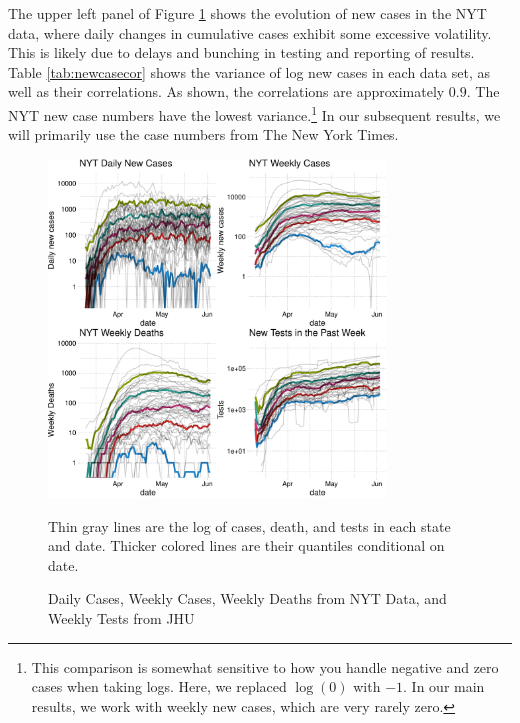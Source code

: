 \documentclass[11pt,reqno,letter]{amsart}
\theoremstyle{definition}
\begin{document}





The upper left panel of Figure \ref{fig:casedeathtest} shows the evolution of new cases in the NYT data, where daily changes in cumulative
cases  exhibit some excessive volatility. This is likely due to delays
and bunching in testing and reporting of results.
Table
\ref{tab:newcasecor} shows the variance of log new cases in each data
set, as well as their correlations. As shown, the correlations are
approximately $0.9$. The NYT new case
numbers have the lowest variance.\footnote{This comparison is somewhat
  sensitive to how you handle negative and zero cases when taking
  logs. Here, we replaced $\log(0)$ with $-1$. In our main
  results, we work with weekly new cases, which are very rarely zero.}
In our subsequent results, we will primarily use the case numbers from
The New York Times.

\begin{figure}[!ht]\caption{Daily Cases, Weekly Cases,  Weekly Deaths from NYT Data, and Weekly Tests from JHU\label{fig:casedeathtest}}\smallskip
  \centering
  \begin{minipage}{\textwidth}
    \centering
    \includegraphics[width=0.8\textwidth,height=0.7\textwidth]{tables_and_figures/casesdeaths_q}
  \end{minipage}
     \begin{flushleft}
      \footnotesize Thin gray lines are the log of cases, death, and tests  in each
      state and date. Thicker colored lines are their quantiles conditional on date.
      \end{flushleft}
\end{figure}
\end{document}
